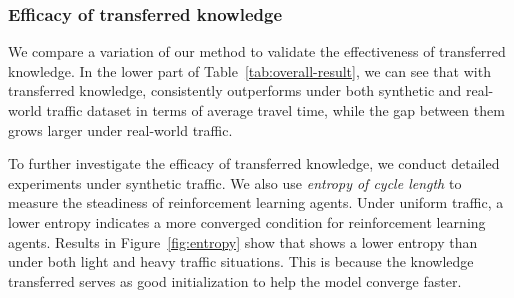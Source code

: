 \subsubsection{Efficacy of transferred knowledge}
We compare a variation of our method to validate the effectiveness of transferred knowledge. In the lower part of Table~\ref{tab:overall-result}, we can see that with transferred knowledge,  \MTDeeplight consistently outperforms \MDeeplight under both synthetic and real-world traffic dataset in terms of average travel time, while the gap between them grows larger under real-world traffic.

To further investigate the efficacy of transferred knowledge, we conduct detailed experiments under synthetic traffic. We also use \textit{entropy of cycle length} to measure the steadiness of reinforcement learning agents. Under uniform traffic, a lower entropy indicates a more converged condition for reinforcement learning agents. Results in Figure~\ref{fig:entropy} show that \MTDeeplight shows a lower entropy than \MDeeplight under both light and heavy traffic situations. This is because the knowledge transferred serves as good initialization to help the model converge faster. 





